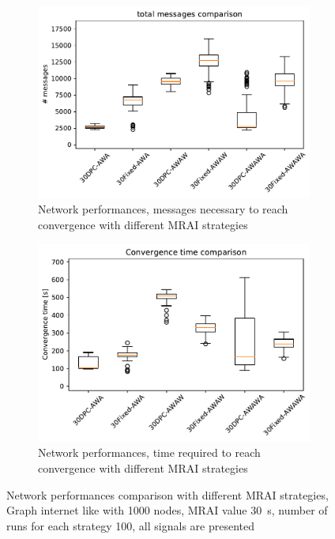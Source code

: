 \begin{figure}[h]
     \centering
     \begin{subfigure}[b]{0.49\textwidth}
         \centering
         \includegraphics[width=\textwidth]{images/internet_like/1000/comparison/comparison_allSignals_messages_boxplot.pdf}
		 \caption{Network performances, messages necessary to reach convergence
			with different \ac{MRAI} strategies}
         \label{fig:boxplot_internet_like_1000_messages_allSignals}
     \end{subfigure}
     \hfill
     \begin{subfigure}[b]{0.49\textwidth}
         \centering
         \includegraphics[width=\textwidth]{images/internet_like/1000/comparison/comparison_allSignals_time_boxplot.pdf}
		 \caption{Network performances, time required to reach convergence
			with different \ac{MRAI} strategies}
         \label{fig:boxplot_internet_like_1000_time_allSignals}
     \end{subfigure}
	 \caption{Network performances comparison with different \ac{MRAI} strategies,
		Graph internet like with \num{1000} nodes, \ac{MRAI} value
		\SI{30}{\second}, number of runs for each strategy \num{100}, all signals
		are presented}
        \label{fig:boxplot_internet_like_1000_allSignals}
\end{figure}

